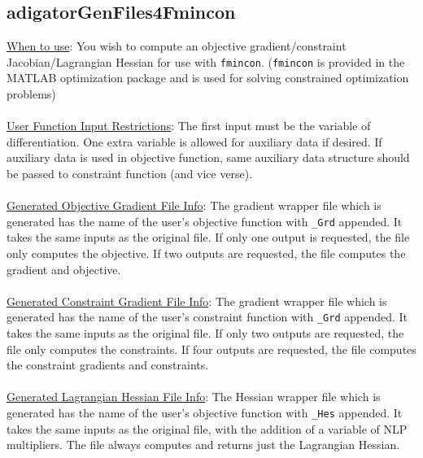 \documentclass[10pt,pdftex]{article}
\begin{document}
\subsection{adigatorGenFiles4Fmincon}
\underline{When to use}: You wish to compute an objective gradient/constraint Jacobian/Lagrangian Hessian for use with \texttt{fmincon}. (\texttt{fmincon} is provided in the MATLAB optimization package and is used for solving constrained optimization problems)\\\\
\underline{User Function Input Restrictions}: The first input must be the variable of differentiation. One extra variable is allowed for auxiliary data if desired. If auxiliary data is used in objective function, same auxiliary data structure should be passed to constraint function (and vice verse).\\\\
\underline{Generated Objective Gradient File Info}: The gradient wrapper file which is generated has the name of the user's objective function with \texttt{\_Grd} appended. It takes the same inputs as the original file. If only one output is requested, the file only computes the objective. If two outputs are requested, the file computes the gradient and objective.\\\\
\underline{Generated Constraint Gradient File Info}: The gradient wrapper file which is generated has the name of the user's constraint function with \texttt{\_Grd} appended. It takes the same inputs as the original file. If only two outputs are requested, the file only computes the constraints. If four outputs are requested, the file computes the constraint gradients and constraints.\\\\
\underline{Generated Lagrangian Hessian File Info}: The Hessian wrapper file which is generated has the name of the user's objective function with \texttt{\_Hes} appended. It takes the same inputs as the original file, with the addition of a variable of NLP multipliers. The file always computes and returns just the Lagrangian Hessian.\\\\
\end{document}

